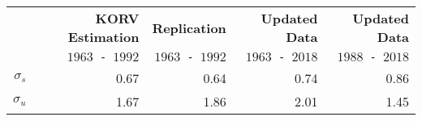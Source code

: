 \begin{tabular}{rrrrr}
  \hline\hline
   & \textbf{KORV Estimation} & \textbf{Replication} & \textbf{Updated Data} & \textbf{Updated Data} \\
   & \texttt{$1963$ - $1992$} & \texttt{$1963$ - $1992$} & \texttt{$1963$ - $2018$} & \texttt{$1988$ - $2018$} \\\hline
  $\sigma_s$ & 0.67 & 0.64 & 0.74 & 0.86 \\
  $\sigma_u$ & 1.67 & 1.86 & 2.01 & 1.45 \\\hline\hline
\end{tabular}
